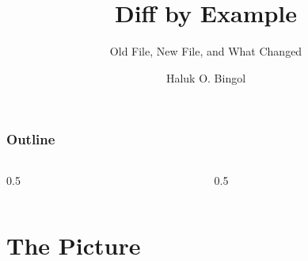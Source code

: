 \documentclass[aspectratio=169,10pt,compress]{beamer}
\title{Diff by Example}
\subtitle{Old File, New File, and What Changed}
\author[Bingol]{Haluk O. Bingol}
\institute[FCIS]{
    Faculty of Computer and Information Sciences\\
    Yeditepe University
}
\date{
	{\tiny \hbTimeStamp}
}
\begin{document}
\begin{frame}[t,fragile]
  \titlepage
\end{frame}

\begin{frame}[t,fragile] \frametitle{Outline}
  \begin{columns}[T]
    \begin{column}{0.5\textwidth}
      \tableofcontents[sections={1-4}]
    \end{column}
    \begin{column}{0.5\textwidth}
      \tableofcontents[sections={5-7}]
    \end{column}
  \end{columns}
\end{frame}

\section[Idea]{The Picture}
\end{document}
